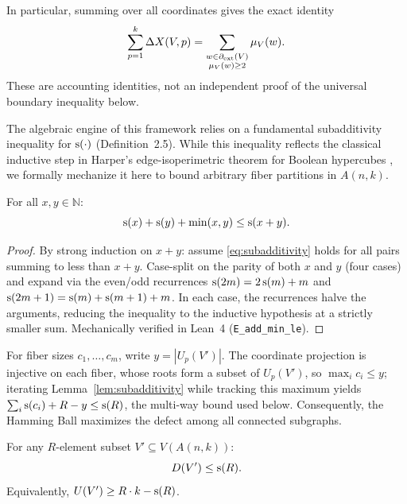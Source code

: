 In particular, summing over all coordinates gives the exact identity
\[
 \sum_{p=1}^k\Delta X(V,p)
 =\sum_{\substack{w\in\partial_{\mathrm{ext}}(V)\\\mu_V(w)\ge2}}\mu_V(w).
\]
These are accounting identities, not an independent proof of the universal
boundary inequality below.

The algebraic engine of this framework relies on a fundamental subadditivity
inequality for $\mathrm{s}(\cdot)$ (Definition~2.5). While this inequality reflects
the classical inductive step in Harper's edge-isoperimetric theorem for Boolean
hypercubes \cite{harper1966optimal}, we formally mechanize it here to bound
arbitrary fiber partitions in $A(n,k)$.

\begin{lemma}[Subadditivity of A000788]\label{lem:subadditivity}
	For all $x, y \in \mathbb{N}$:
	\begin{equation}\label{eq:subadditivity}
		\mathrm{s}(x) + \mathrm{s}(y) + \min(x, y) \leq \mathrm{s}(x + y).
	\end{equation}
\end{lemma}

\begin{proof}
By strong induction on $x + y$: assume \eqref{eq:subadditivity} holds for all
pairs summing to less than $x + y$. Case-split on the parity of both $x$ and $y$
(four cases) and expand via the even/odd recurrences $\mathrm{s}(2m) = 2\, \mathrm{s}(m) +
m$ and $\mathrm{s}(2m+1) = \mathrm{s}(m) + \mathrm{s}(m+1) + m$. In each case, the recurrences
halve the arguments, reducing the inequality to the inductive hypothesis at a
strictly smaller sum. Mechanically verified in Lean~4
(\texttt{E\_add\_min\_le}).
\end{proof}

For fiber sizes $c_1,\ldots,c_m$, write $y=|U_p(V')|$. The coordinate projection
is injective on each fiber, whose roots form a subset of $U_p(V')$, so $\max_i
c_i\le y$; iterating Lemma~\ref{lem:subadditivity} while tracking this maximum
yields $\sum_i \mathrm{s}(c_i)+R-y\le\mathrm{s}(R)$, the multi-way bound used below.
Consequently, the Hamming Ball maximizes the defect among all connected
subgraphs.

\begin{theorem}\label{thm:defect}
	For any $R$-element subset $V' \subseteq V(A(n,k))$:
	\begin{equation}\label{eq:defect-bound}
		D(V') \leq \mathrm{s}(R).
	\end{equation}
	Equivalently, $U(V') \geq R \cdot k - \mathrm{s}(R)$.
\end{theorem}

